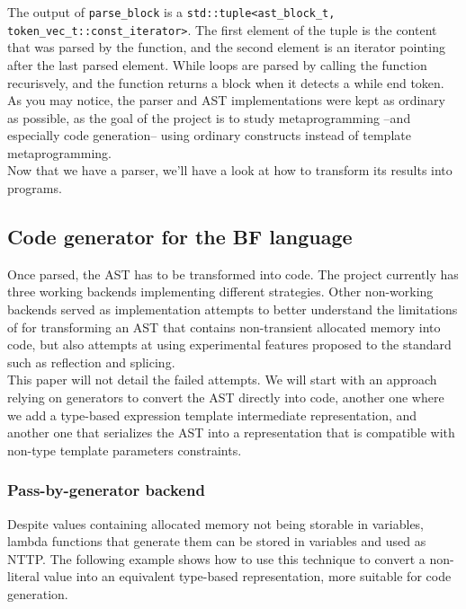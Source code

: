 \documentclass[../../main.tex]{subfiles}
\begin{document}
The output of \lstinline|parse_block| is a
\lstinline|std::tuple<ast_block_t, token_vec_t::const_iterator>|. The first
element of the tuple is the content that was parsed by the function, and the
second element is an iterator pointing after the last parsed element. While
loops are parsed by calling the function recurisvely, and the function returns a
block when it detects a while end token. As you may notice, the parser and AST
implementations were kept as ordinary as possible, as the goal of the
project is to study metaprogramming --and especially code generation-- using
ordinary \cpp constructs instead of template metaprogramming.\\

Now that we have a \constexpr parser, we'll have a look at how to transform its
results into programs.

\subsection{Code generator for the BF language}

Once parsed, the AST has to be transformed into \cpp code. The project currently
has three working backends implementing different strategies. Other
non-working backends served as implementation attempts to better understand the
limitations of  for transforming an AST that contains non-transient
allocated memory into \cpp code, but also attempts at using experimental
features proposed to the \cpp standard such as reflection and
splicing\cite{scalable-reflection}.\\

This paper will not detail the failed attempts. We will start with an approach
relying on generators to convert the AST directly into code, another one where
we add a type-based expression template intermediate representation, and another
one that serializes the AST into a representation that is compatible with
non-type template parameters constraints.

\subsubsection{Pass-by-generator backend}

Despite values containing \constexpr allocated memory not being storable in
\constexpr variables, lambda functions that generate them can be stored in
\constexpr variables and used as NTTP. The following example shows how to use
this technique to convert a non-literal \constexpr value into an equivalent
type-based representation, more suitable for code generation.\\
\end{document}
